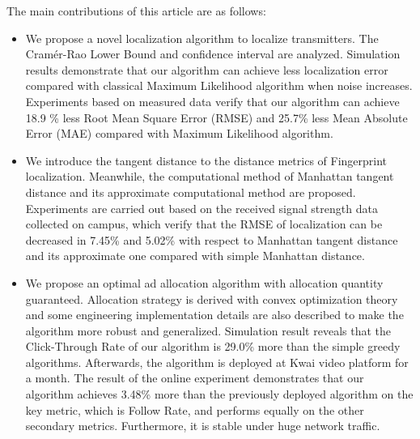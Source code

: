 \begin{eabstract}
   The main contributions of this article are as follows:
   \begin{itemize}
   	\item We propose a novel localization algorithm to localize transmitters. The Cram\'{e}r-Rao Lower Bound and confidence interval are analyzed. Simulation results demonstrate that our algorithm can achieve less localization error compared with classical Maximum Likelihood algorithm when noise increases. Experiments based on measured data verify that our algorithm can achieve 18.9 \% less Root Mean Square Error (RMSE) and 25.7\% less Mean Absolute Error (MAE) compared with Maximum Likelihood algorithm.
   	\item We introduce the tangent distance to the distance metrics of Fingerprint localization. Meanwhile, the computational method of Manhattan tangent distance and its approximate computational method are proposed. Experiments are carried out based on the received signal strength data collected on campus, which verify that the RMSE of localization can be decreased in 7.45\% and 5.02\% with respect to Manhattan tangent distance and its approximate one compared with simple Manhattan distance.
   	\item We propose an optimal ad allocation algorithm with allocation quantity guaranteed. Allocation strategy is derived with convex optimization theory and some engineering implementation details are also described to make the algorithm more robust and generalized. Simulation result reveals that the Click-Through Rate of our algorithm is 29.0\% more than the simple greedy algorithms. Afterwards, the algorithm is deployed at Kwai video platform for a month. The result of the online experiment demonstrates that our algorithm achieves 3.48\% more than the previously deployed algorithm on the  key metric, which is Follow Rate, and performs equally on the other secondary metrics. Furthermore, it is stable under huge network traffic. 
   \end{itemize}
   
\end{eabstract}

